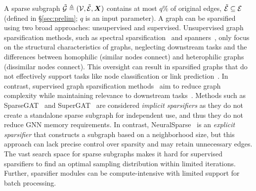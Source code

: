 
A sparse subgraph $\tilde{{\mathcal{G}}} \triangleq ({\mathcal{V}}, \tilde{{\mathcal{E}}},{\bm{X}})$ contains at most $q\%$ of original edges, $\tilde{{\mathcal{E}}} \subseteq {\mathcal{E}}$ (defined in \S\ref{sec:prelim}; $q$ is an input parameter).
A graph can be sparsified using two broad approaches: unsupervised and supervised.
Unsupervised graph sparsification methods, such as spectral sparsification~\cite{batson2013spectral} and spanners~\cite{dragan2011spanners}, only focus on the structural characteristics of graphs, neglecting downstream tasks and the differences between homophilic (similar nodes connect) and heterophilic graphs (dissimilar nodes connect). This oversight can result in sparsified graphs that do not effectively support tasks like node classification or link prediction~\cite{zheng2020robust}. 
In contrast, supervised graph sparsification methods~\cite{zheng2020robust} aim to reduce graph complexity while maintaining relevance to downstream tasks~\cite{luo2021learning,wu2023alleviating,sparsegat}. Methods such as SparseGAT~\cite{sparsegat} and SuperGAT~\cite{kim2022find} are considered \emph{implicit sparsifiers} as they do not create a standalone sparse subgraph for independent use, and thus they do not reduce GNN memory requirements. In contrast, NeuralSparse~\cite{zheng2020robust} is an \emph{explicit sparsifier} that constructs a subgraph based on a neighborhood size, but this approach can lack precise control over sparsity and may retain unnecessary edges. 
The vast search space for sparse subgraphs makes it hard for supervised sparsifiers to find an optimal sampling distribution within limited iterations. Further, sparsifier modules can be compute-intensive with limited support for batch processing.

